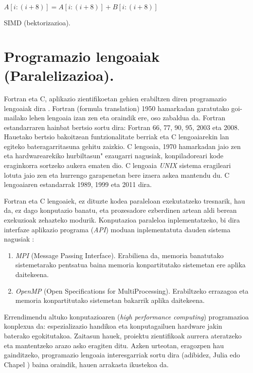 \begin{algorithm}[H]
 \BlankLine
  {
   \BlankLine
    $A[i:(i+8)]=A[i:(i+8)]+B[i:(i+8)]$\;
   \BlankLine
  }
 \caption{SIMD (bektorizazioa).}
\end{algorithm}


\section{Programazio lengoaiak (Paralelizazioa).}

Fortran eta C, aplikazio zientifikoetan gehien erabiltzen diren programazio lengoaiak dira \cite{Higham2015}. Fortran (formula translation) 1950 hamarkadan garatutako goi-mailako lehen lengoaia izan zen eta oraindik ere, oso zabaldua da. Fortran estandarraren hainbat bertsio 
sortu dira: Fortran 66, 77, 90, 95, 2003 eta 2008. Hauetako bertsio bakoitzean funtzionalitate berriak  eta C lengoaiarekin lan egiteko bateragarritasuna gehitu zaizkio.  C lengoaia, 1970 hamarkadan jaio zen eta hardwarearekiko hurbiltasun" ezaugarri nagusiak, konpiladoreari kode eraginkorra sortzeko aukera ematen dio. C lengoaia \emph{UNIX} sistema eragileari lotuta jaio zen eta hurrengo garapenetan bere izaera askea mantendu du. C lengoaiaren estandarrak 1989, 1999 eta 2011 dira.   

Fortran eta C lengoaiek, ez dituzte kodea paraleloan exekutatzeko tresnarik, hau da, ez dago konputazio banatu, eta prozesadore ezberdinen artean aldi berean exekuzioak zehazteko modurik. Konputazioa paraleloa inplementatzeko, bi dira interfaze aplikazio programa (\emph{API}) moduan inplementatuta dauden sistema nagusiak \cite{Pacheco2011}:

\begin{enumerate}
\item  \emph{MPI} (Message Passing Interface).
Erabiliena da, memoria banatutako sistemetarako pentsatua baina memoria konpartitutako sistemetan ere aplika daitekeena.

\item  \emph{OpenMP} (Open Specifications for MultiProcessing).
Erabiltzeko errazagoa eta memoria konpartitutako sistemetan bakarrik aplika daitekeena.

\end{enumerate}

Errendimendu altuko konputazioaren (\emph{high performance computing}) programazioa konplexua da: espezializazio handikoa  eta konputagailuen hardware jakin baterako egokitutakoa. Zaitasun hauek, proiektu zientifikoak aurrera ateratzeko eta mantentzeko arazo asko eragiten ditu. Azken urteotan, eragozpen hau gainditzeko, programazio lengoaia interesgarriak sortu dira (adibidez, Julia \cite{Bezanson2014} edo Chapel \cite{Balaji2015}) baina oraindik, hauen arrakasta ikustekoa da.

